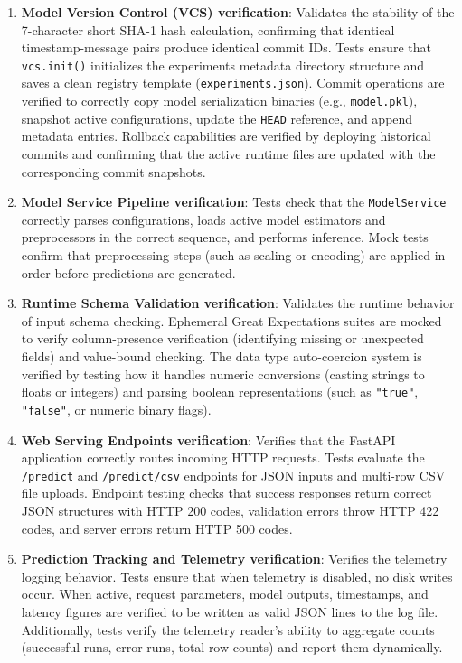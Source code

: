 \documentclass[12pt,a4paper,oneside]{report}
\begin{document}
\begin{enumerate}[leftmargin=*]
  \item \textbf{Model Version Control (VCS) verification}:
    Validates the stability of the 7-character short SHA-1 hash calculation, confirming that identical timestamp-message pairs produce identical commit IDs. Tests ensure that \texttt{vcs.init()} initializes the experiments metadata directory structure and saves a clean registry template (\texttt{experiments.json}). Commit operations are verified to correctly copy model serialization binaries (e.g., \texttt{model.pkl}), snapshot active configurations, update the \texttt{HEAD} reference, and append metadata entries. Rollback capabilities are verified by deploying historical commits and confirming that the active runtime files are updated with the corresponding commit snapshots.
  
  \item \textbf{Model Service Pipeline verification}:
    Tests check that the \texttt{ModelService} correctly parses configurations, loads active model estimators and preprocessors in the correct sequence, and performs inference. Mock tests confirm that preprocessing steps (such as scaling or encoding) are applied in order before predictions are generated.
  
  \item \textbf{Runtime Schema Validation verification}:
    Validates the runtime behavior of input schema checking. Ephemeral Great Expectations suites are mocked to verify column-presence verification (identifying missing or unexpected fields) and value-bound checking. The data type auto-coercion system is verified by testing how it handles numeric conversions (casting strings to floats or integers) and parsing boolean representations (such as \texttt{"true"}, \texttt{"false"}, or numeric binary flags).
  
  \item \textbf{Web Serving Endpoints verification}:
    Verifies that the FastAPI application correctly routes incoming HTTP requests. Tests evaluate the \texttt{/predict} and \texttt{/predict/csv} endpoints for JSON inputs and multi-row CSV file uploads. Endpoint testing checks that success responses return correct JSON structures with HTTP 200 codes, validation errors throw HTTP 422 codes, and server errors return HTTP 500 codes.
  
  \item \textbf{Prediction Tracking and Telemetry verification}:
    Verifies the telemetry logging behavior. Tests ensure that when telemetry is disabled, no disk writes occur. When active, request parameters, model outputs, timestamps, and latency figures are verified to be written as valid JSON lines to the log file. Additionally, tests verify the telemetry reader's ability to aggregate counts (successful runs, error runs, total row counts) and report them dynamically.
  

\end{enumerate}
\end{document}

